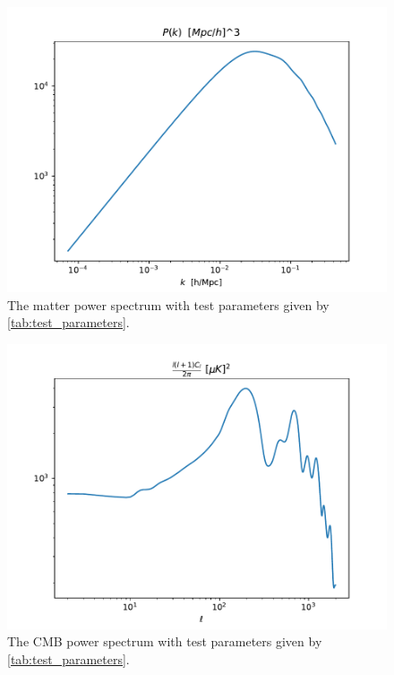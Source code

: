 \documentclass{aa}
\begin{document}
\begin{figure}[H]
   \includegraphics[scale=0.6]{../figures/milestone4/matter_test.pdf}
   \caption{The matter power spectrum with test parameters given by \ref{tab:test_parameters}.}\label{fig:m4_matter_test}
\end{figure}

\begin{figure}[H]
   \includegraphics[scale=0.6]{../figures/milestone4/cell_test.pdf}
   \caption{The CMB power spectrum with test parameters given by \ref{tab:test_parameters}.}\label{fig:m4_cell_test}
\end{figure}
\end{document}
